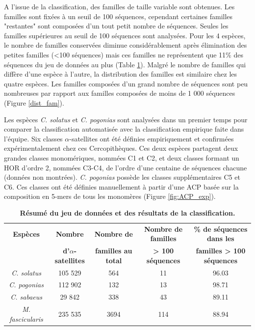 \documentclass[12pt,a4paper]{article}
\begin{document}
			A l'issue de la classification, des familles de taille variable sont obtenues. Les familles sont fixées à un seuil de 100 séquences, cependant certaines familles "restantes" sont composées d'un tout petit nombre de séquences. Seules les familles supérieures au seuil de 100 séquences sont analysées. Pour les 4 espèces, le nombre de familles conservées diminue considérablement après élimination des petites familles (<100 séquences) mais ces familles ne représentent que 11\% des séquences du jeu de données au plus (Table \ref{tab_res}).  Malgré le nombre de familles qui diffère d'une espèce à l'autre, la distribution des familles est similaire chez les quatre espèces. Les familles composées d'un grand nombre de séquences sont peu nombreuses par rapport aux familles composées de moins de 1 000 séquences (Figure \ref{dist_fam}). 

	Les espèces \textit{C. solatus} et \textit{C. pogonias} sont analysées dans un premier temps pour comparer la classification automatisée avec la classification empirique faite dans l'équipe. Six classes $\alpha$-satellites ont été définies empiriquement et confirmées expérimentalement chez ces Cercopithèques. Ces deux espèces partagent deux grandes classes monomériques, nommées C1 et C2, et deux classes formant un HOR d'ordre 2, nommées C3-C4, de l'ordre d'une centaine de séquences chacune (données non montrées). \textit{C. pogonias} possède les classes supplémentaires C5 et C6. Ces classes ont été définies manuellement à partir d'une ACP basée sur la composition en 5-mers de tous les monomères (Figure \ref{fig:ACP_exp}). 
	
		\begin{table}
			\caption{\textbf{Résumé du jeu de données et des résultats de la classification.}}
			\center
			\begin{tabular}{|c|c|c|c|c|}
   			\hline
  			\textbf{Espèces} & \textbf{Nombre } & \textbf{Nombre de } & \textbf{Nombre de familles} & \textbf{\%  de séquences dans les}\\
  			 & \textbf{d'$\alpha$-satellites } & \textbf{familles au total} & \textbf{ > 100 séquences} & \textbf{familles > 100 séquences}\\
  		    \hline
   			\textit{C. solatus} & 105 529 & 564 & 11 & 96.03  \\
   			\hline
    		\textit{C. pogonias} & 112 902 & 132 & 13 & 98.71\\
   			\hline
   			\textit{C. sabaeus} & 29 842 & 338 & 43 & 89.11\\
   			\hline
   			\textit{M. fascicularis} & 235 535 & 3694 & 114 & 88.94\\
   			\hline			
			\end{tabular}			
			\label{tab_res}
		\end{table}		
		
\end{document}
